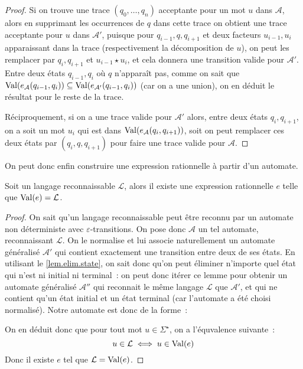 \begin{proof}
  Si on trouve une trace $(q_0,\ldots,q_n)$ acceptante pour un mot $u$ dans
  $\mathcal A$, alors en supprimant les occurrences de $q$ dans cette trace
  on obtient une trace acceptante pour $u$ dans $\mathcal A'$, puisque pour
  $q_{i-1},q,q_{i+1}$ et deux facteurs $u_{i-1},u_i$ apparaissant dans la trace
  (respectivement la décomposition de $u$), on peut les remplacer par
  $q_i,q_{i+1}$ et $u_{i-1}\star u_i$, et cela donnera une transition valide pour
  $\mathcal A'$. Entre deux états $q_{i-1},q_i$ où $q$ n'apparaît pas, comme
  on sait que
  $\operatorname{Val}(e_{\mathcal A}(q_{i-1},q_i))\subseteq \operatorname{Val}(e_{\mathcal A'}(q_{i-1},q_i))$
  (car on a une union), on en déduit le résultat pour le reste de la trace.

  Réciproquement, si on a une trace valide pour $\mathcal A'$ alors, entre deux
  états $q_{i},q_{i+1}$, on a soit un mot $u_i$ qui est dans
  $\operatorname{Val}(e_{\mathcal A}(q_i,q_{i+1}))$, soit on peut remplacer ces deux états par
  $(q_i,q,q_{i+1})$ pour faire une trace valide pour $\mathcal A$.
\end{proof}

On peut donc enfin construire une expression rationnelle à partir d'un automate.

\begin{proposition}
  Soit un langage reconnaissable $\mathcal L$, alors il existe une expression
  rationnelle $e$ telle que $\operatorname{Val}(e) = \mathcal L$.
\end{proposition}

\begin{proof}
  On sait qu'un langage reconnaissable peut être reconnu par un automate non
  déterministe avec $\varepsilon$-transitions. On pose donc $\mathcal A$ un
  tel automate, reconnaissant $\mathcal L$. On le normalise et lui associe
  naturellement un automate généralisé $\mathcal A'$ qui contient exactement une
  transition entre deux de ses états. En utilisant le \cref{lem.elim.state},
  on sait donc qu'on peut éliminer n'importe quel état qui n'est ni initial ni
  terminal~: on peut donc itérer ce lemme pour obtenir un automate généralisé
  $\mathcal A''$ qui reconnait le même langage $\mathcal L$ que $\mathcal A'$,
  et qui ne contient qu'un état initial et un état terminal (car l'automate
  a été choisi normalisé). Notre automate est donc de la forme~:
  \begin{figure}[h]
    \centering
  \end{figure}
  
  On en déduit donc que pour tout mot $u \in \Sigma^\star$, on a l'équvalence
  suivante~:
  \[u \in \mathcal L \iff u \in \operatorname{Val}(e)\]
  Donc il existe $e$ tel que $\mathcal L = \operatorname{Val}(e)$.
\end{proof}

